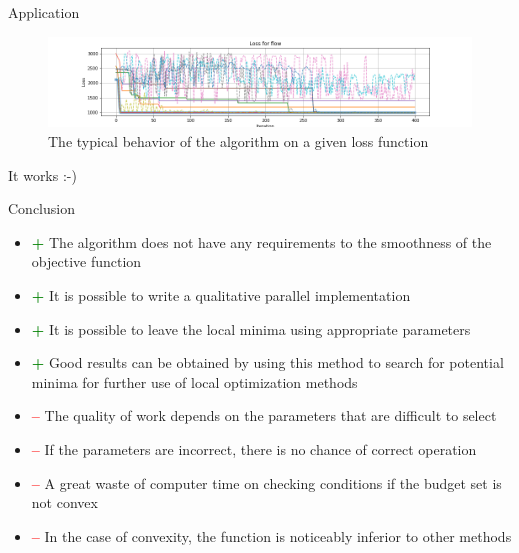 \documentclass[final,hyperref]{beamer}
\begin{document}
\begin{frame}[t]
\begin{columns}[t]
\begin{column}{.465\textwidth}
\begin{block}{Application}
	
	\begin{figure}[H]
		\includegraphics[width=1.0\linewidth]{flow_tr.png}
		\caption{The typical behavior of the algorithm on a given loss function}
	\end{figure}
	It works :-)

\end{block}


\begin{block}{Conclusion}

\begin{itemize}
	\item 
		\textcolor{green}{\textbf{+}} The algorithm does not have any requirements to the smoothness
						of the objective function
	\item	
		\textcolor{green}{\textbf{+}} It is possible to write a qualitative parallel implementation
	\item	
		\textcolor{green}{\textbf{+}} It is possible to leave the local minima using appropriate parameters
	\item
		\textcolor{green}{\textbf{+}} Good results can be obtained by using this method to search 
						for potential minima for further use of local optimization methods


	\item
		\textcolor{red}{\textbf{--}} The quality of work depends on the parameters that are difficult to select
	\item
		\textcolor{red}{\textbf{--}} If the parameters are incorrect, there is no chance of correct operation
	\item
		\textcolor{red}{\textbf{--}} A great waste of computer time on checking conditions if the budget set is not convex
	\item
		\textcolor{red}{\textbf{--}} In the case of convexity, the function is noticeably inferior to other methods

\end{itemize}

\end{block}


\end{column}
\end{columns}
\end{frame}
\end{document}
